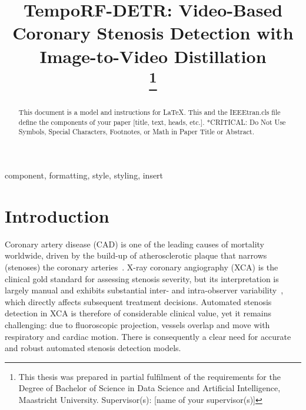 \documentclass[conference]{IEEEtran}
\begin{document}
\title{TempoRF-DETR: Video-Based Coronary Stenosis Detection with Image-to-Video Distillation\\
\thanks{This thesis was prepared in partial fulfilment of the requirements for the Degree of Bachelor of Science in Data Science and Artificial Intelligence, Maastricht University. Supervisor(s): [name of your supervisor(s)]}
}

\author{
}

\maketitle

\begin{abstract}
This document is a model and instructions for \LaTeX.
This and the IEEEtran.cls file define the components of your paper [title, text, heads, etc.]. *CRITICAL: Do Not Use Symbols, Special Characters, Footnotes, 
or Math in Paper Title or Abstract.
\end{abstract}

\begin{IEEEkeywords}
component, formatting, style, styling, insert
\end{IEEEkeywords}

\section{Introduction}

Coronary artery disease (CAD) is one of the leading causes of mortality worldwide, driven by the build-up of atherosclerotic plaque that narrows (stenoses) the coronary arteries~\cite{popov2022reviewmodernapproachescoronary}. X-ray coronary angiography (XCA) is the clinical gold standard for assessing stenosis severity, but its interpretation is largely manual and exhibits substantial inter- and intra-observer variability~\cite{zir1976interobserver, cardiovascular}, which directly affects subsequent treatment decisions. Automated stenosis detection in XCA is therefore of considerable clinical value, yet it remains challenging: due to fluoroscopic projection, vessels overlap and move with respiratory and cardiac motion. There is consequently a clear need for accurate and robust automated stenosis detection models.
\end{document}
